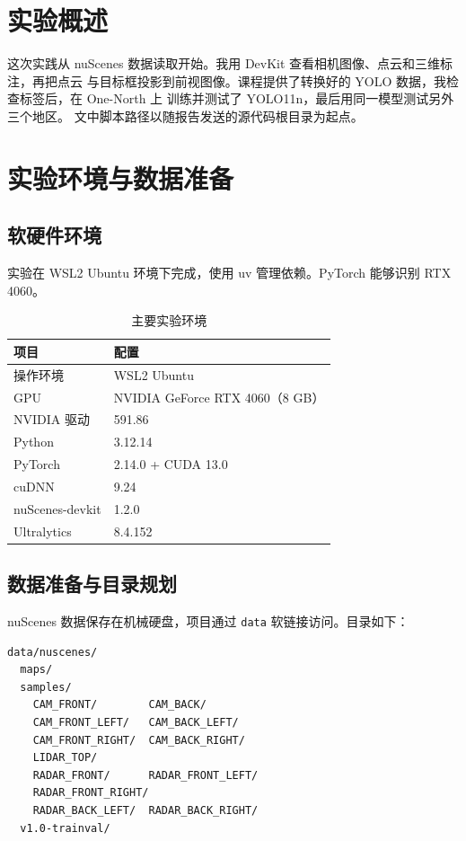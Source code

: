 \documentclass[UTF8,zihao=5,scheme=chinese]{ctexart}
\begin{document}
\makecoursecover
\tableofcontents
\clearpage

\section{实验概述}

这次实践从 nuScenes 数据读取开始。我用 DevKit 查看相机图像、点云和三维标注，再把点云
与目标框投影到前视图像。课程提供了转换好的 YOLO 数据，我检查标签后，在 One-North 上
训练并测试了 YOLO11n，最后用同一模型测试另外三个地区。
文中脚本路径以随报告发送的源代码根目录为起点。

\section{实验环境与数据准备}

\subsection{软硬件环境}

实验在 WSL2 Ubuntu 环境下完成，使用 uv 管理依赖。PyTorch 能够识别 RTX 4060。

\begin{table}[htbp]
  \centering
  \caption{主要实验环境}
  \label{tab:environment}
  \begin{tabular}{ll}
    \toprule
    项目 & 配置 \\
    \midrule
    操作环境 & WSL2 Ubuntu \\
    GPU & NVIDIA GeForce RTX 4060（8 GB） \\
    NVIDIA 驱动 & 591.86 \\
    Python & 3.12.14 \\
    PyTorch & 2.14.0 + CUDA 13.0 \\
    cuDNN & 9.24 \\
    nuScenes-devkit & 1.2.0 \\
    Ultralytics & 8.4.152 \\
    \bottomrule
  \end{tabular}
\end{table}

\subsection{数据准备与目录规划}

nuScenes 数据保存在机械硬盘，项目通过 \texttt{data} 软链接访问。目录如下：

\begin{verbatim}
data/nuscenes/
  maps/
  samples/
    CAM_FRONT/        CAM_BACK/
    CAM_FRONT_LEFT/   CAM_BACK_LEFT/
    CAM_FRONT_RIGHT/  CAM_BACK_RIGHT/
    LIDAR_TOP/
    RADAR_FRONT/      RADAR_FRONT_LEFT/
    RADAR_FRONT_RIGHT/
    RADAR_BACK_LEFT/  RADAR_BACK_RIGHT/
  v1.0-trainval/
\end{verbatim}
\end{document}
